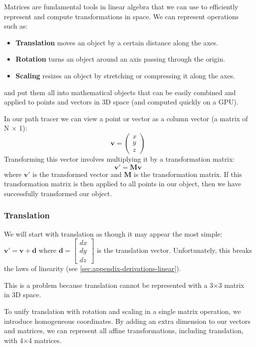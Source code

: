 \documentclass[12pt]{article}
\begin{document}
Matrices are fundamental tools in linear algebra that we can use to efficiently represent and compute transformations in space. We can represent operations such as:

\begin{itemize}
    \item \textbf{Translation} moves an object by a certain distance along the axes.
    \item \textbf{Rotation} turns an object around an axis passing through the origin.
    \item \textbf{Scaling} resizes an object by stretching or compressing it along the axes.
\end{itemize}

and put them all into mathematical objects that can be easily combined and applied to points and vectors in 3D space (and computed quickly on a GPU).

In our path tracer we can view a point or vector as a column vector (a matrix of N $\times$ 1):
\[
    \mathbf{v} = \begin{pmatrix} x \\ y \\ z \end{pmatrix}
\]
Transforming this vector involves multiplying it by a transformation matrix:
\[
    \mathbf{v}' = \mathbf{M} \mathbf{v}
\]
where \(\mathbf{v}'\) is the transformed vector and \(\mathbf{M}\) is the transformation matrix.
If this transformation matrix is then applied to all points in our object, then we have successfully transformed our object.

\subsubsection{Translation}

We will start with translation as though it may appear the most simple:
\( \mathbf{v}' = \mathbf{v} + \mathbf{d} \)
where \( \mathbf{d} = \begin{bmatrix} dx \\ dy \\ dz \end{bmatrix} \) is the translation vector.
Unfortunately, this breaks the laws of linearity (see \autoref{sec:appendix-derivations-linear}).

This is a problem because translation cannot be represented with a 3$\times$3 matrix in 3D space.


To unify translation with rotation and scaling in a single matrix operation, we introduce homogeneous coordinates. By adding an extra dimension to our vectors and matrices, we can represent all affine transformations, including translation, with 4$\times$4 matrices.
\end{document}
